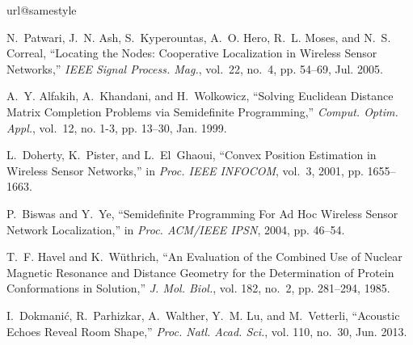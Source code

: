 \documentclass[10pt,double]{IEEEtran}
\begin{document}
\begin{thebibliography}{10}
\providecommand{\url}[1]{#1}
\csname url@samestyle\endcsname
\providecommand{\newblock}{\relax}
\providecommand{\bibinfo}[2]{#2}
\providecommand{\BIBentrySTDinterwordspacing}{\spaceskip=0pt\relax}
\providecommand{\BIBentryALTinterwordstretchfactor}{4}
\providecommand{\BIBentryALTinterwordspacing}{\spaceskip=\fontdimen2\font plus
\BIBentryALTinterwordstretchfactor\fontdimen3\font minus
  \fontdimen4\font\relax}
\providecommand{\BIBforeignlanguage}[2]{{\expandafter\ifx\csname l@#1\endcsname\relax
\typeout{** WARNING: IEEEtran.bst: No hyphenation pattern has been}\typeout{** loaded for the language `#1'. Using the pattern for}\typeout{** the default language instead.}\else
\language=\csname l@#1\endcsname
\fi
#2}}
\providecommand{\BIBdecl}{\relax}
\BIBdecl

N.~Patwari, J.~N. Ash, S.~Kyperountas, A.~O. Hero, R.~L. Moses, and N.~S.
  Correal, ``{Locating the Nodes: Cooperative Localization in Wireless Sensor
  Networks},'' \emph{IEEE Signal Process. Mag.}, vol.~22, no.~4, pp. 54--69,
  Jul. 2005.

A.~Y. Alfakih, A.~Khandani, and H.~Wolkowicz, ``Solving {E}uclidean Distance
  Matrix Completion Problems via Semidefinite Programming,''
  \emph{Comput. Optim. Appl.}, vol.~12, no. 1-3, pp.
  13--30, Jan. 1999.

L.~Doherty, K.~Pister, and L.~El~Ghaoui, ``Convex Position Estimation in
  Wireless Sensor Networks,'' in \emph{Proc. IEEE INFOCOM}, vol.~3, 2001, pp.
  1655--1663.

P.~Biswas and Y.~Ye, ``Semidefinite Programming For Ad Hoc Wireless Sensor
  Network Localization,'' in \emph{Proc. ACM/IEEE IPSN}, 2004, pp. 46--54.



T.~F. Havel and K.~W\"{u}thrich, ``An Evaluation of the Combined Use of Nuclear
  Magnetic Resonance and Distance Geometry for the Determination of Protein
  Conformations in Solution,'' \emph{J. Mol. Biol.}, vol. 182,
  no.~2, pp. 281--294, 1985.





I.~Dokmani{\'c}, R.~Parhizkar, A.~Walther, Y.~M. Lu, and M.~Vetterli,
  ``{Acoustic Echoes Reveal Room Shape},'' \emph{Proc. Natl. Acad. Sci.}, vol.
  110, no.~30, Jun. 2013.




\end{thebibliography}
\end{document}
